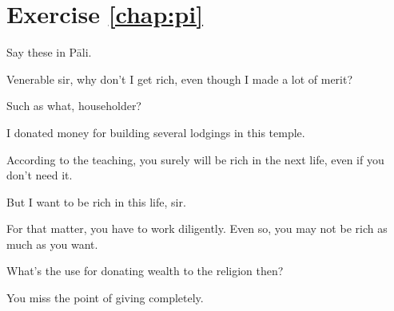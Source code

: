 \section*{Exercise \ref{chap:pi}}
Say these in P\=ali.
\begin{compactenum}
\item Venerable sir, why don't I get rich, even though I made a lot of merit?
\item Such as what, householder?
\item I donated money for building several lodgings in this temple.
\item According to the teaching, you surely will be rich in the next life, even if you don't need it.
\item But I want to be rich in this life, sir.
\item For that matter, you have to work diligently. Even so, you may not be rich as much as you want.
\item What's the use for donating wealth to the religion then?
\item You miss the point of giving completely.
\end{compactenum}
